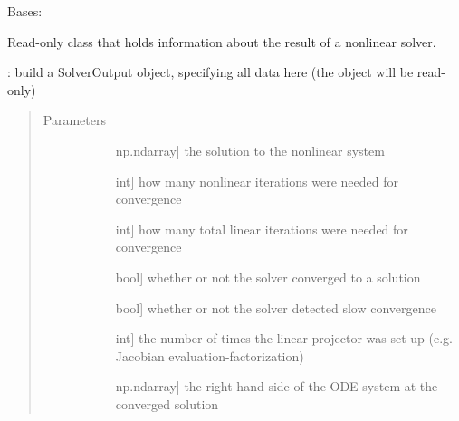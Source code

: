 \documentclass[letterpaper,10pt,english]{sphinxmanual}
\begin{document}
\begin{fulllineitems}
\label{\detokenize{spitfire.time.nonlinear:spitfire.time.nonlinear.SolverOutput}}
Bases: 

Read-only class that holds information about the result of a nonlinear solver.

: build a SolverOutput object, specifying all data here (the object will be read-only)
\begin{quote}\begin{description}
\item[{Parameters}] \leavevmode\begin{description}
\item[{}] \leavevmode{[}np.ndarray{]}
the solution to the nonlinear system

\item[{}] \leavevmode{[}int{]}
how many nonlinear iterations were needed for convergence

\item[{}] \leavevmode{[}int{]}
how many total linear iterations were needed for convergence

\item[{}] \leavevmode{[}bool{]}
whether or not the solver converged to a solution

\item[{}] \leavevmode{[}bool{]}
whether or not the solver detected slow convergence

\item[{}] \leavevmode{[}int{]}
the number of times the linear projector was set up (e.g. Jacobian evaluation-factorization)

\item[{}] \leavevmode{[}np.ndarray{]}
the right-hand side of the ODE system at the converged solution

\end{description}

\end{description}\end{quote}


\end{fulllineitems}
\end{document}
